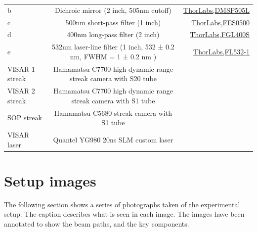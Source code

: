 \begin{landscape}
\begin{table} [ht]
\begin{tabular}{lcr}
\hline
b & Dichroic mirror (2 inch, 505nm cutoff) & \href{https://www.thorlabs.com/thorproduct.cfm?partnumber=DMSP505L}{ThorLabs,DMSP505L}\\
c & 500nm short-pass filter (1 inch) & \href{https://www.thorlabs.com/thorproduct.cfm?partnumber=FES0500}{ThorLabs,FES0500}\\
d & 400nm long-pass filter (2 inch) & \href{https://www.thorlabs.com/thorproduct.cfm?partnumber=FGL400S}{ThorLabs,FGL400S}\\
e & 532nm laser-line filter (1 inch, 532 ± 0.2 nm, FWHM = 1 ± 0.2 nm ) & \href{https://www.thorlabs.com/thorproduct.cfm?partnumber=FL532-1}{ThorLabs,FL532-1}\\
\hline
VISAR 1 streak & Hamamatsu C7700 high dynamic range streak camera with S20 tube &\\
VISAR 2 streak & Hamamatsu C7700 high dynamic range streak camera with S1 tube &\\
SOP streak & Hamamatsu C5680 streak camera with S1 tube & \\
VISAR laser & Quantel YG980 20ns SLM custom laser & \\
\hline\hline
\end{tabular}
\end{table}
\end{landscape}

\section{Setup images}

The following section shows a series of photographs taken of the experimental setup. The caption describes what is seen in each image. The images have been annotated to show the beam paths, and the key components.

